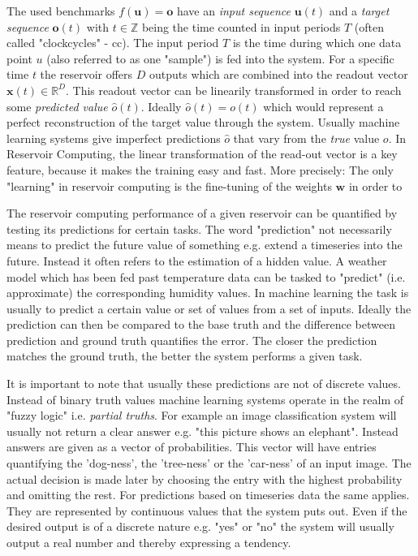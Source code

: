 The used benchmarks $f(\mathbf{u}) = \mathbf{o}$ have an \emph{input sequence} $\mathbf{u}(t)$ and a \emph{target sequence} $\textbf{o}(t)$ with $t \in \mathbb{Z}$ being the time counted in input periods $T$ (often called "clockcycles" - cc). The input period $T$ is the time during which one data point $u$ (also referred to as one "sample") is fed into the system. For a specific time $t$ the reservoir offers $D$ outputs which are combined into the readout vector $\textbf{x}(t) \in \mathbb{R}^D$. This readout vector can be linearily transformed in order to reach some \emph{predicted value} $\hat{o}(t)$. Ideally $\hat{o}(t) = o(t)$ which would represent a perfect reconstruction of the target value through the system. Usually machine learning systems give imperfect predictions $\hat{o}$ that vary from the \emph{true} value $o$. In Reservoir Computing, the linear transformation of the read-out vector is a key feature, because it makes the training easy and fast. More precisely: The only "learning" in reservoir computing is the fine-tuning of the weights  $\mathbf{w}$ in order to 

The reservoir computing performance of a given reservoir can be quantified by testing its predictions for certain tasks. The word "prediction" not necessarily means to predict the future value of something e.g. extend a timeseries into the future. Instead it often refers to the estimation of a hidden value. A weather model which has been fed past temperature data can be tasked to "predict" (i.e. approximate) the corresponding humidity values. In machine learning the task is usually to predict a certain value or set of values from a set of inputs. Ideally the prediction can then be compared to the base truth and the difference between prediction and ground truth quantifies the error. The closer the prediction matches the ground truth, the better the system performs a given task. 

It is important to note that usually these predictions are not of discrete values. Instead of binary truth values machine learning systems operate in the realm of "fuzzy logic" i.e. \emph{partial truths}. For example an image classification system will usually not return a clear answer e.g. "this picture shows an elephant". Instead answers are given as a vector of probabilities. This vector will have entries quantifying the 'dog-ness', the 'tree-ness' or the 'car-ness' of an input image. The actual decision is made later by choosing the entry with the highest probability and omitting the rest. 
For predictions based on timeseries data the same applies. They are represented by continuous values that the system puts out. Even if the desired output is of a discrete nature e.g. "yes" or "no" the system will usually output a real number and thereby expressing a tendency.

